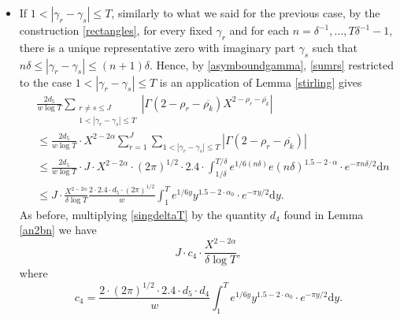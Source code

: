 \documentclass[reqno]{amsart}
\numberwithin{equation}{section}
\theoremstyle{remark}
\begin{document}
\begin{itemize}
\begin{equation}
\begin{aligned}
\end{aligned}
\end{equation}
where we used the fact that $\delta>\nu_i(T_1)$ ($i=1,2,3$ or $4$ depending on the range $(T_0,T_1]$). Again, multiplying \eqref{singbet1anddelta} by the bound for the first factor in \eqref{afterhalaszmont} given in Lemma \ref{an2bn}, we get
\begin{equation}\label{boundc3}
    J\cdot c_3\cdot \frac{X^{2-2\alpha}}{\delta\log T},
\end{equation}
where 
\[
c_3=\frac{ 2\cdot d_4\cdot d_5\cdot 1.0067\cdot 1.12}{w}\cdot \log(\nu_i(T_1))^{-1}
\]
is always a constant depending on $\alpha_0,u,x,v,w,T_0,T_1$ whose numerical values can be found in Table \ref{cconstants} in Appendix \ref{numerical}.
\item  If $1<|\gamma_r-\gamma_s|\le T$, similarly to what we said for the previous case, by the construction \eqref{rectangles}, for every fixed $\gamma_r$ and for each $n=\delta^{-1},\dots,T\delta^{-1}-1$, there is a unique representative zero with imaginary part $\gamma_s$ such that $n\delta\le |\gamma_r-\gamma_s|\le (n+1)\delta$. Hence, by \eqref{asymboundgamma}, \eqref{sumrs} restricted to the case $1< |\gamma_r-\gamma_s|\le T$ is an application of Lemma \ref{stirling} gives
 \begin{equation}\label{singdeltaT}
        \begin{aligned}
        &\frac{2d_5}{w\log T}\sum_{\substack{r\ne s\le J\\1<|\gamma_r-\gamma_s|\le T}} \left|\Gamma\left(2-\rho_r-\overline{\rho_k}\right)X^{2-\rho_r-\overline{\rho_k}}\right|\\
            &\le \frac{2d_5}{w\log T}\cdot X^{2-2\alpha}\sum_{r=1}^J\sum_{1<|\gamma_r-\gamma_s|\le T}\left|\Gamma\left(2-\rho_r-\overline{\rho_k}\right)\right|\\&\le  \frac{2d_5}{w\log T}\cdot J\cdot X^{2-2\alpha}\cdot (2\pi)^{1/2}\cdot 2.4\cdot \int_{1/\delta}^{T/\delta}e^{1/6(n\delta)}e(n\delta)^{1.5-2\cdot\alpha}\cdot e^{-\pi n\delta/2}\text{d}n\\&\le  J\cdot \frac{X^{2-2\alpha}}{\delta \log T}\frac{2\cdot 2.4\cdot d_5\cdot (2\pi)^{1/2}}{w} \int_{1}^{T}e^{1/6y}y^{1.5-2\cdot\alpha_0}\cdot e^{-\pi y/2}\text{d}y.
        \end{aligned}
    \end{equation}
    As before, multiplying \eqref{singdeltaT} by the quantity $d_4$ found in Lemma \ref{an2bn} we have
    \begin{equation}\label{boundc4}
         J\cdot c_4\cdot \frac{X^{2-2\alpha}}{\delta\log T},
    \end{equation}
where
    \[
    c_4=\frac{2\cdot (2\pi)^{1/2}\cdot 2.4\cdot d_5\cdot d_4}{w}\int_{1}^{T}e^{1/6y}y^{1.5-2\cdot\alpha_0}\cdot e^{-\pi y/2}\text{d}y.
    \]
\end{itemize}
\end{document}
